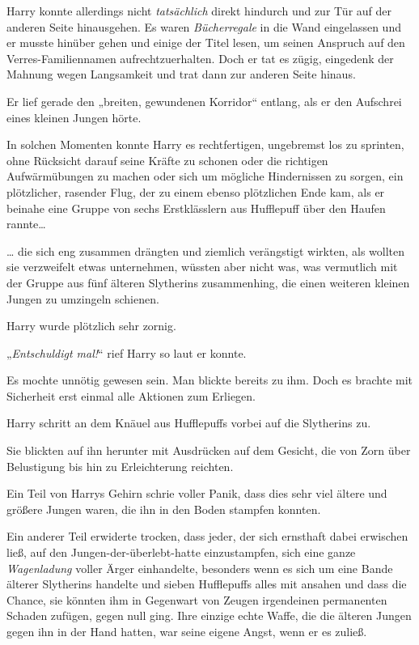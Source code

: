 {Harry konnte allerdings nicht \emph{tatsächlich} direkt hindurch und zur Tür auf der anderen Seite hinausgehen. Es waren \emph{Bücherregale} in die Wand eingelassen und er musste hinüber gehen und einige der Titel lesen, um seinen Anspruch auf den Verres-Familiennamen aufrechtzuerhalten. Doch er tat es zügig, eingedenk der Mahnung wegen Langsamkeit und trat dann zur anderen Seite hinaus.

Er lief gerade den „breiten, gewundenen Korridor“ entlang, als er den Aufschrei eines kleinen Jungen hörte.

In solchen Momenten konnte Harry es rechtfertigen, ungebremst los zu sprinten, ohne Rücksicht darauf seine Kräfte zu schonen oder die richtigen Aufwärmübungen zu machen oder sich um mögliche Hindernissen zu sorgen, ein plötzlicher, rasender Flug, der zu einem ebenso plötzlichen Ende kam, als er beinahe eine Gruppe von sechs Erstklässlern aus Hufflepuff über den Haufen rannte…

… die sich eng zusammen drängten und ziemlich verängstigt wirkten, als wollten sie verzweifelt etwas unternehmen, wüssten aber nicht was, was vermutlich mit der Gruppe aus fünf älteren Slytherins zusammenhing, die einen weiteren kleinen Jungen zu umzingeln schienen.

Harry wurde plötzlich sehr zornig.

„\emph{Entschuldigt mal!}“ rief Harry so laut er konnte.

Es mochte unnötig gewesen sein. Man blickte bereits zu ihm. Doch es brachte mit Sicherheit erst einmal alle Aktionen zum Erliegen.

Harry schritt an dem Knäuel aus Hufflepuffs vorbei auf die Slytherins zu.

Sie blickten auf ihn herunter mit Ausdrücken auf dem Gesicht, die von Zorn über Belustigung bis hin zu Erleichterung reichten.

Ein Teil von Harrys Gehirn schrie voller Panik, dass dies sehr viel ältere und größere Jungen waren, die ihn in den Boden stampfen konnten.

Ein anderer Teil erwiderte trocken, dass jeder, der sich ernsthaft dabei erwischen ließ, auf den Jungen-der-überlebt-hatte einzustampfen, sich eine ganze \emph{Wagenladung} voller Ärger einhandelte, besonders wenn es sich um eine Bande älterer Slytherins handelte und sieben Hufflepuffs alles mit ansahen und dass die Chance, sie könnten ihm in Gegenwart von Zeugen irgendeinen permanenten Schaden zufügen, gegen null ging. Ihre einzige echte Waffe, die die älteren Jungen gegen ihn in der Hand hatten, war seine eigene Angst, wenn er es zuließ.

}
